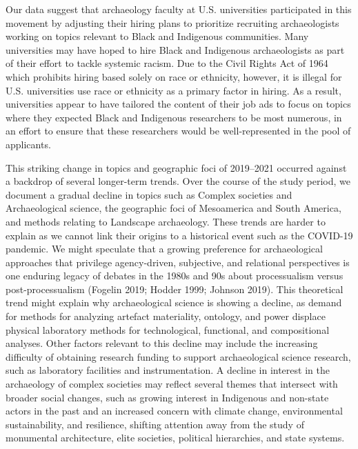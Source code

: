 \documentclass[
  12pt,
]{article}
\begin{document}
Our data suggest that archaeology faculty at U.S. universities
participated in this movement by adjusting their hiring plans to
prioritize recruiting archaeologists working on topics relevant to Black
and Indigenous communities. Many universities may have hoped to hire
Black and Indigenous archaeologists as part of their effort to tackle
systemic racism. Due to the Civil Rights Act of 1964 which prohibits
hiring based solely on race or ethnicity, however, it is illegal for
U.S. universities use race or ethnicity as a primary factor in hiring.
As a result, universities appear to have tailored the content of their
job ads to focus on topics where they expected Black and Indigenous
researchers to be most numerous, in an effort to ensure that these
researchers would be well-represented in the pool of applicants.

This striking change in topics and geographic foci of 2019--2021
occurred against a backdrop of several longer-term trends. Over the
course of the study period, we document a gradual decline in topics such
as Complex societies and Archaeological science, the geographic foci of
Mesoamerica and South America, and methods relating to Landscape
archaeology. These trends are harder to explain as we cannot link their
origins to a historical event such as the COVID-19 pandemic. We might
speculate that a growing preference for archaeological approaches that
privilege agency-driven, subjective, and relational perspectives is one
enduring legacy of debates in the 1980s and 90s about processualism
versus post-processualism (Fogelin 2019; Hodder 1999; Johnson 2019).
This theoretical trend might explain why archaeological science is
showing a decline, as demand for methods for analyzing artefact
materiality, ontology, and power displace physical laboratory methods
for technological, functional, and compositional analyses. Other factors
relevant to this decline may include the increasing difficulty of
obtaining research funding to support archaeological science research,
such as laboratory facilities and instrumentation. A decline in interest
in the archaeology of complex societies may reflect several themes that
intersect with broader social changes, such as growing interest in
Indigenous and non-state actors in the past and an increased concern
with climate change, environmental sustainability, and resilience,
shifting attention away from the study of monumental architecture, elite
societies, political hierarchies, and state systems.
\end{document}
